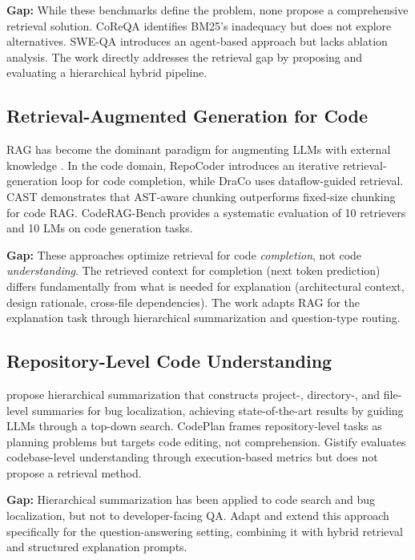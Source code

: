 \documentclass[11pt]{article}
\begin{document}
\textbf{Gap:} While these benchmarks define the problem, none propose a comprehensive retrieval solution. CoReQA identifies BM25's inadequacy but does not explore alternatives. SWE-QA introduces an agent-based approach but lacks ablation analysis. The work directly addresses the retrieval gap by proposing and evaluating a hierarchical hybrid pipeline.

\subsection{Retrieval-Augmented Generation for Code}

RAG has become the dominant paradigm for augmenting LLMs with external knowledge \citep{gao2024rag}. In the code domain, RepoCoder \citep{zhang2023repocoder} introduces an iterative retrieval-generation loop for code completion, while DraCo \citep{cheng2024draco} uses dataflow-guided retrieval. CAST \citep{cast2025} demonstrates that AST-aware chunking outperforms fixed-size chunking for code RAG. CodeRAG-Bench \citep{wang2025coderag} provides a systematic evaluation of 10 retrievers and 10 LMs on code generation tasks.

\textbf{Gap:} These approaches optimize retrieval for code \textit{completion}, not code \textit{understanding}. The retrieved context for completion (next token prediction) differs fundamentally from what is needed for explanation (architectural context, design rationale, cross-file dependencies). The work adapts RAG for the explanation task through hierarchical summarization and question-type routing.

\subsection{Repository-Level Code Understanding}

\citet{tufek2025hierarchical} propose hierarchical summarization that constructs project-, directory-, and file-level summaries for bug localization, achieving state-of-the-art results by guiding LLMs through a top-down search. CodePlan \citep{bairi2024codeplan} frames repository-level tasks as planning problems but targets code editing, not comprehension. Gistify \citep{gistify2025} evaluates codebase-level understanding through execution-based metrics but does not propose a retrieval method.

\textbf{Gap:} Hierarchical summarization has been applied to code search and bug localization, but not to developer-facing QA. Adapt and extend this approach specifically for the question-answering setting, combining it with hybrid retrieval and structured explanation prompts.
\end{document}
